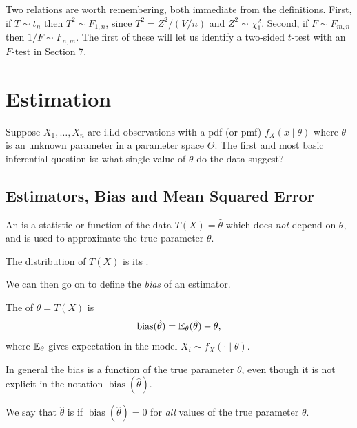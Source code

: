 \documentclass[a4paper]{scrartcl}
\newcommand{\bias}{\operatorname{bias}}
\begin{document}
Two relations are worth remembering, both immediate from the definitions. First, if $T \sim t_n$ then $T^2 \sim F_{1,n}$, since $T^2 = Z^2/(V/n)$ and $Z^2 \sim \chi^2_1$. Second, if $F \sim F_{m,n}$ then $1/F \sim F_{n,m}$. The first of these will let us identify a two-sided $t$-test with an $F$-test in Section 7.


\section{Estimation}

Suppose $X_1, \dots, X_n$ are i.i.d observations with a pdf (or pmf)
$
f_X(x \mid \theta)
$
where $\theta$ is an unknown parameter in a parameter space $\Theta$. The first and most basic inferential question is: what single value of $\theta$ do the data suggest?

\subsection{Estimators, Bias and Mean Squared Error}

\begin{definition}[Estimator]
An  is a statistic or function of the data $T(X) = \hat{\theta}$ which does \emph{not} depend on $\theta$, and is used to approximate the true parameter $\theta$.
\end{definition}


The distribution of $T(X)$ is its .

We can then go on to define the \emph{bias} of an estimator.

\begin{definition}[Bias]
  The  of $\hat{\theta} = T(X)$ is
  $$
  \bias(\hat{\theta}) = \EE_{\theta} (\hat{\theta}) - \theta,
  $$
  where $\mathbb{E}_\theta$ gives expectation in the model $X_i \sim f_X(\cdot \mid \theta)$.
\end{definition}

\begin{remark}
  In general the bias is a function of the true parameter $\theta$, even though it is not explicit in the notation $\bias(\hat{\theta})$.
\end{remark}

\begin{definition}
  We say that $\hat{\theta}$ is  if $\bias(\hat{\theta}) = 0$ for \emph{all} values of the true parameter $\theta$.
\end{definition}
\end{document}
